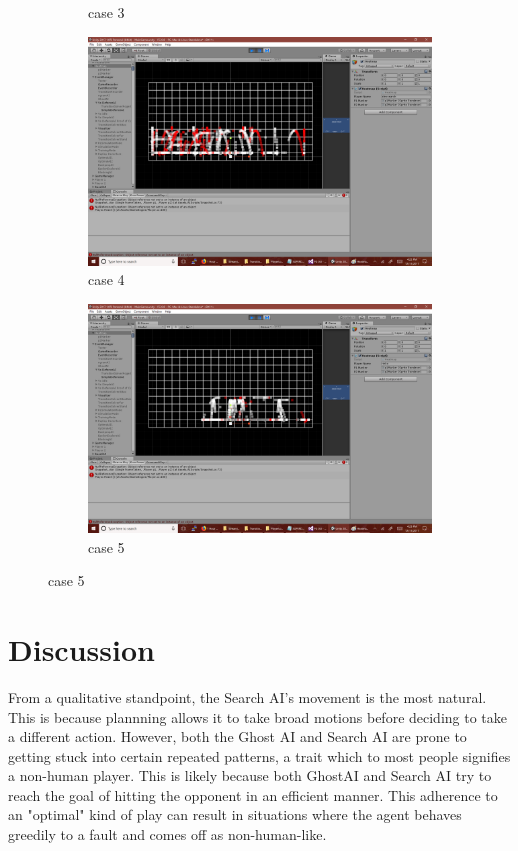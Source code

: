 \begin{figure}[h]
\begin{subfigure}[h]{0.3\textwidth}
		\caption{case 3}
		\label{}
	\end{subfigure}
	\begin{subfigure}[h]{0.3\textwidth}
		\centering
		\includegraphics[width=\textwidth]{Figures/HeatmapAI.png}
		\caption{case 4}
		\label{}
	\end{subfigure}
	\begin{subfigure}[h]{0.3\textwidth}
		\centering
		\includegraphics[width=\textwidth]{Figures/HeatmapOther.png}
		\caption{case 5}
		\label{}
	\end{subfigure}
\end{figure}


\section{Discussion}

From a qualitative standpoint, the Search AI's movement is the most natural. This is because plannning allows it to take broad motions before deciding to take a different action. However, both the Ghost AI and Search AI are prone to getting stuck into certain repeated patterns, a trait which to most people signifies a non-human player. This is likely because both GhostAI and Search AI try to reach the goal of hitting the opponent in an efficient manner. This adherence to an "optimal" kind of play can result in situations where the agent behaves greedily to a fault and comes off as non-human-like.

